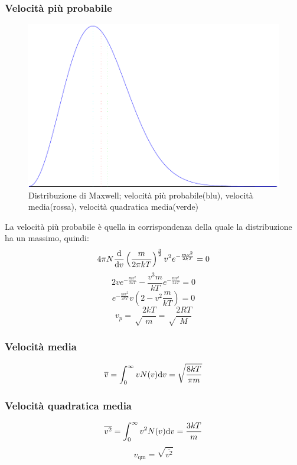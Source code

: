 \subsubsection{Velocità più probabile}
\begin{figure}[htbp]
\centering
\includegraphics[scale=0.5]{immagini/fisica1/maxwell}
\caption{Distribuzione di Maxwell; velocità più probabile(blu), velocità media(rossa), velocità quadratica media(verde)}
\end{figure}
La velocità più probabile è quella in corrispondenza della quale la distribuzione ha un massimo, quindi:
$$4\pi N\frac{\mathrm{d}}{\mathrm{d} v}\left(\frac{m}{2\pi kT}\right)^{\frac{3}{2}}v^2e^{-\frac{mv^2}{2kT}}=0$$
$$2ve^{-\frac{mv^2}{2kT}}-\frac{v^3m}{kT}e^{-\frac{mv^2}{2kT}}=0$$
$$e^{-\frac{mv^2}{2kT}}v\left(2-v^2\frac{m}{kT}\right)=0$$
\begin{equation}
v_p=\sqrt\frac{2kT}{m}=\sqrt\frac{2RT}{M}
\end{equation}

\subsubsection{Velocità media}
\begin{equation}
\overline{v}=\int_0^\infty vN(v)\mathrm{d} v=\sqrt\frac{8kT}{\pi m}
\end{equation}

\subsubsection{Velocità quadratica media}
\begin{equation}
\overline{v^2}=\int_0^\infty v^2N(v)\mathrm{d} v=\frac{3kT}{m}
\end{equation}
$$v_\text{qm}=\sqrt{\overline{v^2}}$$



